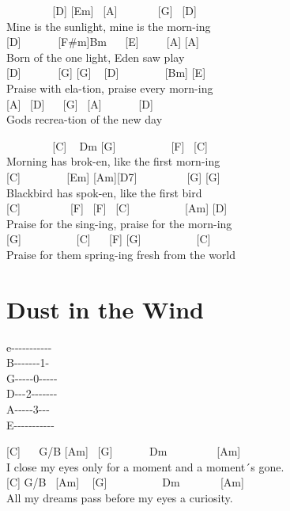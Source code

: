 \documentclass[
  letterpaper,
]{scrbook}
\begin{document}
~ ~ ~ ~ ~ {[}D{]} {[}Em{]} ~{[}A{]} ~ ~ ~ ~ {[}G{]} ~{[}D{]}\\
Mine is the sunlight, mine is the morn-ing\\
{[}D{]} ~ ~ ~ ~{[}F\#m{]}Bm ~ ~{[}E{]} ~ ~ ~{[}A{]} {[}A{]}\\
Born of the one light, Eden saw play\\
{[}D{]} ~ ~ ~ ~{[}G{]} {[}G{]} ~ {[}D{]} ~ ~ ~ ~ ~{[}Bm{]} {[}E{]}\\
Praise with ela-tion, praise every morn-ing\\
{[}A{]} ~{[}D{]} ~ ~{[}G{]} ~{[}A{]} ~ ~ ~ ~{[}D{]}\\
God\textquotesingle s recrea-tion of the new day

~ ~ ~ ~ ~ {[}C{]} ~ Dm {[}G{]} ~ ~ ~ ~ ~ ~{[}F{]} ~{[}C{]}\\
Morning has brok-en, like the first morn-ing\\
{[}C{]} ~ ~ ~ ~ ~{[}Em{]} {[}Am{]}{[}D7{]} ~ ~ ~ ~ ~ {[}G{]} {[}G{]}\\
Blackbird has spok-en, like the first bird\\
{[}C{]} ~ ~ ~ ~ ~ {[}F{]} ~{[}F{]} ~{[}C{]} ~ ~ ~ ~ ~ ~{[}Am{]}
{[}D{]}\\
Praise for the sing-ing, praise for the morn-ing\\
{[}G{]} ~ ~ ~ ~ ~ ~{[}C{]} ~ ~{[}F{]} {[}G{]} ~ ~ ~ ~ ~ ~{[}C{]}\\
Praise for them spring-ing fresh from the world

\hypertarget{dust-in-the-wind}{%
\chapter{Dust in the Wind}\label{dust-in-the-wind}}

e\textbar-\/-\/-\/-\/-\/-\/-\/-\/-\/-\/-\textbar{}\\
B-\/-\/-\/-\/-\/-\/-1-\textbar{}\\
G\textbar-\/-\/-\/-\/-0-\/-\/-\/-\/-\textbar{}\\
D\textbar-\/-\/-2-\/-\/-\/-\/-\/-\/-\textbar{}\\
A-\/-\/-\/-\/-3-\/-\/-\textbar{}\\
E\textbar-\/-\/-\/-\/-\/-\/-\/-\/-\/-\/-\textbar{}

{[}C{]} ~ ~G/B {[}Am{]} ~{[}G{]} ~ ~ ~ ~Dm ~ ~ ~ ~ ~ {[}Am{]}\\
I close my eyes only for a moment and a moment´s gone.\\
{[}C{]} G/B ~{[}Am{]} ~ {[}G{]} ~ ~ ~ ~ ~ ~Dm ~ ~ ~ ~ {[}Am{]}\\
All my dreams pass before my eyes a curiosity.
\end{document}
